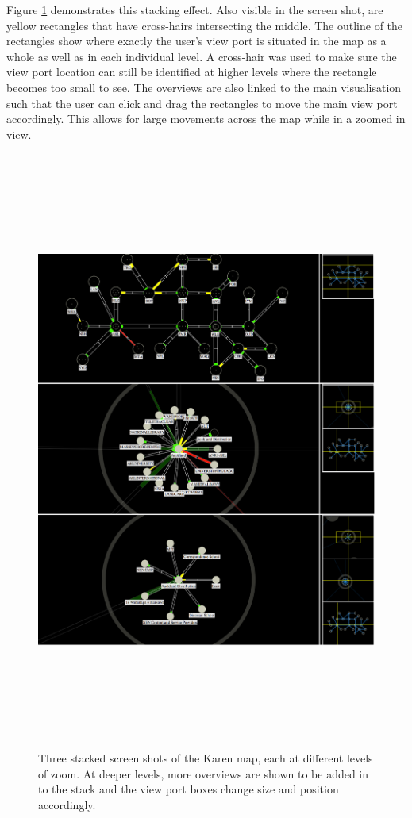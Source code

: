 \documentclass[11pt, a4paper]{article}
\begin{document}
Figure \ref{fig:overviews1.0} demonstrates this stacking effect. Also visible in
the screen shot, are yellow rectangles that have cross-hairs intersecting the
middle. The outline of the rectangles show where exactly the user's view port is
situated in the map as a whole as well as in each individual level. A cross-hair
was used to make sure the view port location can still be identified at higher
levels where the rectangle becomes too small to see. The overviews are also
linked to the main visualisation such that the user can click and drag the
rectangles to move the main view port accordingly. This allows for large
movements across the map while in a zoomed in view.

\begin{figure}
\centering
\includegraphics[width=170mm,height=197.95mm]{assets/overviews1-0.eps}
\caption{Three stacked screen shots of the Karen map, each at different levels
of zoom. At deeper levels, more overviews are shown to be added in to the stack
and the view port boxes change size and position accordingly.}
\label{fig:overviews1.0}
\end{figure}
\end{document}
